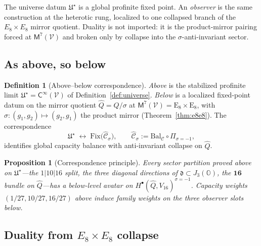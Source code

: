 \documentclass[aps,prd,onecolumn,amsmath,amssymb,nofootinbib,11pt]{revtex4-2}
\numberwithin{equation}{section}
\theoremstyle{plain}
\newtheorem{proposition}[theorem]{Proposition}
\theoremstyle{definition}
\newtheorem{definition}[theorem]{Definition}
\theoremstyle{remark}
\newcommand{\jalg}{J_3(\mathbb{O})}
\newcommand{\E}[1]{\mathrm{E}_{#1}}
\newcommand{\Void}{\mathcal{V}}
\newcommand{\Mirror}{\mathsf{M}}
\newcommand{\Climb}{\mathsf{C}}
\begin{document}
The universe datum $\mathfrak{U}^\star$ is a global profinite fixed point.
An \emph{observer} is the same construction at the heterotic rung, localized
to one collapsed branch of the $E_8\times E_8$ mirror quotient. Duality is not
imported: it is the product-mirror pairing forced at $\Mirror^7(\Void)$ and
broken only by collapse into the $\sigma$-anti-invariant sector.

\subsection{As above, so below}
\label{sec:observer:above-below}

\begin{definition}[Above--below correspondence]\label{def:above-below}
\emph{Above} is the stabilized profinite limit
$\mathfrak{U}^\star=\Climb^\infty(\Void)$ of Definition~\ref{def:universe}.
\emph{Below} is a localized fixed-point datum on the mirror quotient
$\hat Q=Q/\sigma$ at $\Mirror^7(\Void)=\E{8}\times\E{8}$, with
$\sigma:(g_1,g_2)\mapsto(g_2,g_1)$ the product mirror
(Theorem~\ref{thm:e8e8}). The correspondence
\begin{equation}\label{eq:above-below}
  \mathfrak{U}^\star \;\longleftrightarrow\;
  \mathrm{Fix}\!\bigl(\hat{\mathcal{C}}_\sigma\bigr),
  \qquad
  \hat{\mathcal{C}}_\sigma := \mathrm{Bal}_{\mathcal{C}}\circ \Pi_{\sigma=-1},
\end{equation}
identifies global capacity balance with anti-invariant collapse on $\hat Q$.
\end{definition}

\begin{proposition}[Correspondence principle]\label{prop:above-below}
Every sector partition proved above on $\mathfrak{U}^\star$---the $1|10|16$
split, the three diagonal directions of $\mathfrak{d}\subset\jalg$, the
$\mathbf{16}$ bundle on $\hat Q$---has a below-level avatar on
$H^\bullet(\hat Q,V_{16})^{\sigma=-1}$. Capacity weights
$(1/27,10/27,16/27)$ above induce family weights on the three observer slots
below.
\end{proposition}

\subsection{Duality from $E_8\times E_8$ collapse}
\label{sec:observer:duality}
\end{document}
